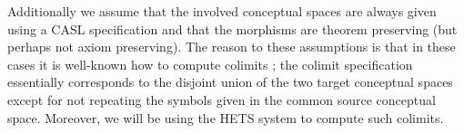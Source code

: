 
Additionally we assume that the involved conceptual spaces are
always given using a
CASL specification \cite{MoHaSaTa08} and that the morphisms are theorem
preserving (but perhaps not axiom preserving). The reason to these
assumptions
is that in these cases it is well-known how to compute colimits
\cite{Mo98a}; the colimit specification essentially corresponds to the
disjoint union of the two target conceptual spaces except for not
repeating the symbols given in the common source conceptual space.
Moreover, we will be using 
the HETS system \parencite{MossakowskiEA06} to compute such colimits.









